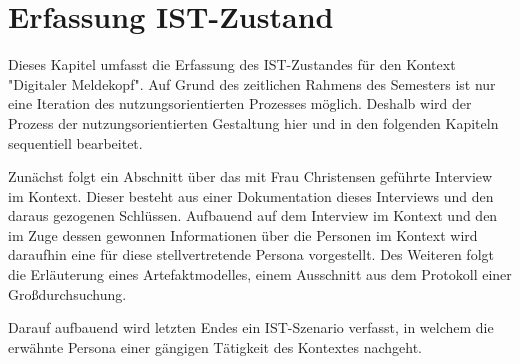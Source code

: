 \chapter{Erfassung IST-Zustand}\label{sec:anwendung}

Dieses Kapitel umfasst die Erfassung des IST-Zustandes für den Kontext "Digitaler Meldekopf".
Auf Grund des zeitlichen Rahmens des Semesters ist nur eine Iteration des nutzungsorientierten Prozesses möglich.
Deshalb wird der Prozess der nutzungsorientierten Gestaltung hier und in den folgenden Kapiteln sequentiell bearbeitet.

Zunächst folgt ein Abschnitt über das mit Frau Christensen geführte Interview im Kontext.
Dieser besteht aus einer Dokumentation dieses Interviews und den daraus gezogenen Schlüssen.
Aufbauend auf dem Interview im Kontext und den im Zuge dessen gewonnen Informationen über die Personen im Kontext wird daraufhin eine für diese stellvertretende Persona vorgestellt.
Des Weiteren folgt die Erläuterung eines Artefaktmodelles, einem Ausschnitt aus dem Protokoll einer Großdurchsuchung.

Darauf aufbauend wird letzten Endes ein IST-Szenario verfasst, in welchem die erwähnte Persona einer gängigen Tätigkeit des Kontextes nachgeht.
